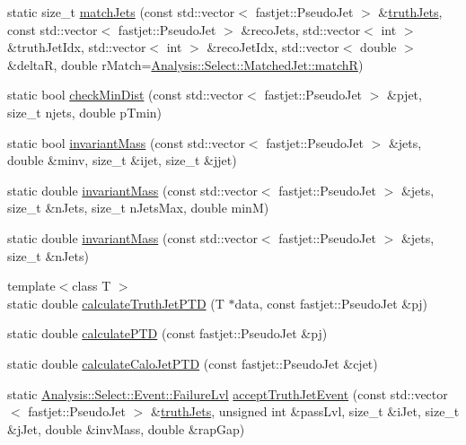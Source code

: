 \begin{DoxyCompactItemize}
static size\+\_\+t \hyperlink{structAnalysisHelper_a509f97174575766528894801855cfd77}{match\+Jets} (const std\+::vector$<$ fastjet\+::\+Pseudo\+Jet $>$ \&\hyperlink{structAnalysisHelper_ab026a5fb00af407a144f3cd990f00fe4}{truth\+Jets}, const std\+::vector$<$ fastjet\+::\+Pseudo\+Jet $>$ \&reco\+Jets, std\+::vector$<$ int $>$ \&truth\+Jet\+Idx, std\+::vector$<$ int $>$ \&reco\+Jet\+Idx, std\+::vector$<$ double $>$ \&deltaR, double r\+Match=\hyperlink{namespaceAnalysis_1_1Select_1_1MatchedJet_ad59f2cab2bdc032b32b4ce0321ecfbb1}{Analysis\+::\+Select\+::\+Matched\+Jet\+::matchR})
\item 
static bool \hyperlink{structAnalysisHelper_a104c3904efd47e507f7e20aa4096ab5c}{check\+Min\+Dist} (const std\+::vector$<$ fastjet\+::\+Pseudo\+Jet $>$ \&pjet, size\+\_\+t njets, double p\+Tmin)
\item 
static bool \hyperlink{structAnalysisHelper_a5a7154a962779f54caa41a223b0a3225}{invariant\+Mass} (const std\+::vector$<$ fastjet\+::\+Pseudo\+Jet $>$ \&jets, double \&minv, size\+\_\+t \&ijet, size\+\_\+t \&jjet)
\item 
static double \hyperlink{structAnalysisHelper_a9c7d26925c1bb55a5f71a29c03a84c9d}{invariant\+Mass} (const std\+::vector$<$ fastjet\+::\+Pseudo\+Jet $>$ \&jets, size\+\_\+t \&n\+Jets, size\+\_\+t n\+Jets\+Max, double minM)
\item 
static double \hyperlink{structAnalysisHelper_ac1de158225503c4bf21b28c80f57aa5b}{invariant\+Mass} (const std\+::vector$<$ fastjet\+::\+Pseudo\+Jet $>$ \&jets, size\+\_\+t \&n\+Jets)
\item 
{\footnotesize template$<$class T $>$ }\\static double \hyperlink{structAnalysisHelper_a0644063767044703c33477d0219ad82a}{calculate\+Truth\+Jet\+P\+TD} (T $\ast$data, const fastjet\+::\+Pseudo\+Jet \&pj)
\item 
static double \hyperlink{structAnalysisHelper_ad8db9b718fc465ce1ba1335d70f4d7ae}{calculate\+P\+TD} (const fastjet\+::\+Pseudo\+Jet \&pj)
\item 
static double \hyperlink{structAnalysisHelper_a93bc92874d7f2ace01aa6c7263bd5fff}{calculate\+Calo\+Jet\+P\+TD} (const fastjet\+::\+Pseudo\+Jet \&cjet)
\item 
static \hyperlink{namespaceAnalysis_1_1Select_1_1Event_a52c4d90d5d3ef88d9ca5c6a16798cbdb}{Analysis\+::\+Select\+::\+Event\+::\+Failure\+Lvl} \hyperlink{structAnalysisHelper_a11ae81406fba4d4220ff2a0ee295cd2b}{accept\+Truth\+Jet\+Event} (const std\+::vector$<$ fastjet\+::\+Pseudo\+Jet $>$ \&\hyperlink{structAnalysisHelper_ab026a5fb00af407a144f3cd990f00fe4}{truth\+Jets}, unsigned int \&pass\+Lvl, size\+\_\+t \&i\+Jet, size\+\_\+t \&j\+Jet, double \&inv\+Mass, double \&rap\+Gap)

\end{DoxyCompactItemize}
